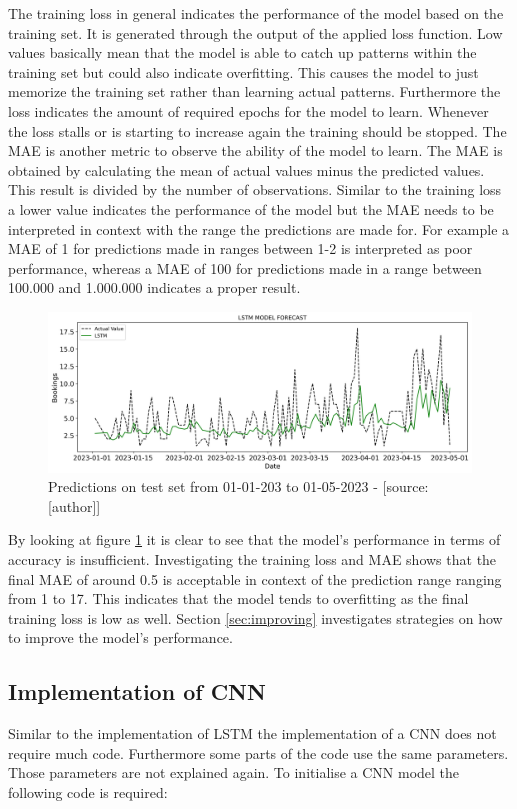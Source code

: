 The training loss in general indicates the performance of the model based on the training set. It is generated through the output of the applied loss function. Low values basically mean that the model is able to catch up patterns within the training set but could also indicate overfitting. This causes the model to just memorize the training set rather than learning actual patterns. Furthermore the loss indicates the amount of required epochs for the model to learn. Whenever the loss stalls or is starting to increase again the training should be stopped. The MAE is another metric to observe the ability of the model to learn. The MAE is obtained by calculating the mean of actual values minus the predicted values. This result is divided by the number of observations.\cite{mae} Similar to the training loss a lower value indicates the performance of the model but the MAE needs to be interpreted in context with the range the predictions are made for. For example a MAE of 1 for predictions made in ranges between 1-2 is interpreted as poor performance, whereas a MAE of 100 for predictions made in a range between 100.000 and 1.000.000 indicates a proper result.

\begin{figure}[H]
	\centering
		\includegraphics[width=14cm]{images/paper_1_lstm_1_prediction}
	\caption{Predictions on test set from 01-01-203 to 01-05-2023 - [source:[author]]}
	\label{fig:lstm_1_training_test}
\end{figure}
By looking at figure \ref{fig:lstm_1_training_test} it is clear to see that the model's performance in terms of accuracy is insufficient. Investigating the training loss and MAE shows that the final MAE of around 0.5 is acceptable in context of the prediction range ranging from 1 to 17. This indicates that the model tends to overfitting as the final training loss is low as well. Section \ref{sec:improving} investigates strategies on how to improve the model's performance.

\subsection{Implementation of CNN}
Similar to the implementation of LSTM the implementation of a CNN does not require much code. Furthermore some parts of the code use the same parameters. Those parameters are not explained again. To initialise a CNN model the following code is required: 

